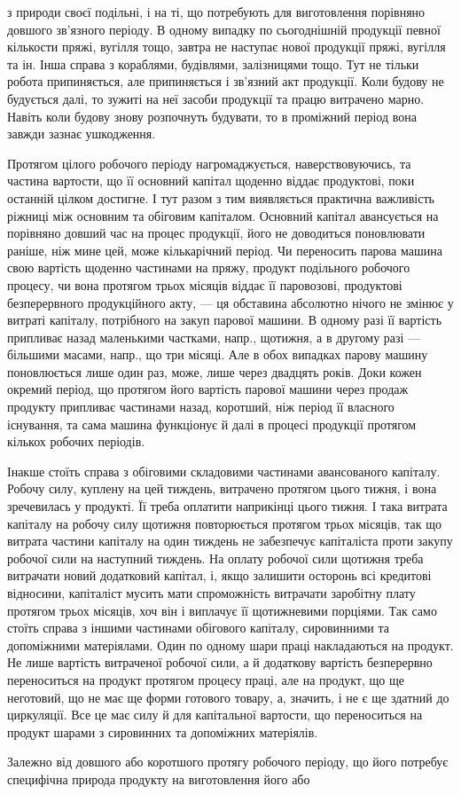 з природи своєї подільні, і на ті, що потребують для виготовлення порівняно
довшого зв’язного періоду. В одному випадку по сьогоднішній
продукції певної кількости пряжі, вугілля тощо, завтра не наступає нової
продукції пряжі, вугілля та ін. Інша справа з кораблями, будівлями, залізницями
тощо. Тут не тільки робота припиняється, але припиняється
і зв’язний акт продукції. Коли будову не будується далі, то зужиті на
неї засоби продукції та працю витрачено марно. Навіть коли будову знову
розпочнуть будувати, то в проміжний період вона завжди зазнає ушкодження.

Протягом цілого робочого періоду нагромаджується, наверствовуючись,
та частина вартости, що її основний капітал щоденно віддає продуктові,
поки останній цілком достигне. І тут разом з тим виявляється практична
важливість ріжниці між основним та обіговим капіталом. Основний капітал
авансується на порівняно довший час на процес продукції, його не
доводиться поновлювати раніше, ніж мине цей, може кількарічний період.
Чи переносить парова машина свою вартість щоденно частинами на пряжу,
продукт подільного робочого процесу, чи вона протягом трьох місяців
віддає її паровозові, продуктові безперервного продукційного акту, —
ця обставина абсолютно нічого не змінює у витраті капіталу, потрібного
на закуп парової машини. В одному разі її вартість припливає назад маленькими
частками, напр., щотижня, а в другому разі — більшими масами,
напр., що три місяці. Але в обох випадках парову машину поновлюється
лише один раз, може, лише через двадцять років. Доки кожен окремий
період, що протягом його вартість парової машини через продаж продукту
припливає частинами назад, коротший, ніж період її власного існування,
та сама машина функціонує й далі в процесі продукції протягом
кількох робочих періодів.

Інакше стоїть справа з обіговими складовими частинами авансованого
капіталу. Робочу силу, куплену на цей тиждень, витрачено протягом
цього тижня, і вона зречевилась у продукті. Її треба оплатити наприкінці
цього тижня. І така витрата капіталу на робочу силу щотижня повторюється
протягом трьох місяців, так що витрата частини капіталу на
один тиждень не забезпечує капіталіста проти закупу робочої сили на
наступний тиждень. На оплату робочої сили щотижня треба витрачати
новий додатковий капітал, і, якщо залишити осторонь всі кредитові відносини,
капіталіст мусить мати спроможність витрачати заробітну плату
протягом трьох місяців, хоч він і виплачує її щотижневими порціями. Так
само стоїть справа з іншими частинами обігового капіталу, сировинними
та допоміжними матеріялами. Один по одному шари праці накладаються на
продукт. Не лише вартість витраченої робочої сили, а й додаткову
вартість безперервно переноситься на продукт протягом процесу праці,
але на продукт, що ще неготовий, що не має ще форми готового товару,
а, значить, і не є ще здатний до циркуляції. Все це має силу й для капітальної
вартости, що переноситься на продукт шарами з сировинних та
допоміжних матеріялів.

Залежно від довшого або коротшого протягу робочого періоду, що
його потребує специфічна природа продукту на виготовлення його або

